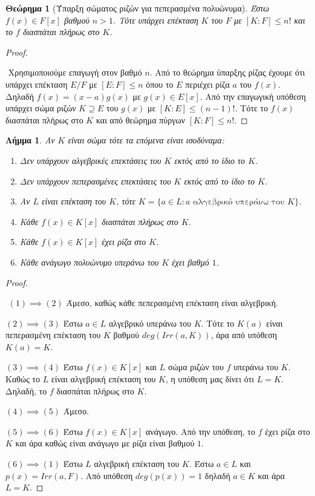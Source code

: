 \documentclass[oneside,a4paper]{article}
\newtheorem{theorem}{Θεώρημα}
\newtheorem{lemma}{Λήμμα}
\begin{document}
\begin{theorem}[Ύπαρξη σώματος ριζών για πεπερασμένα πολυώνυμα] Έστω $f(x) \in F[x]$ βαθμού $n>1$. Τότε υπάρχει επέκταση $K$ του $F$ με $[K:F]\leq n!$ και το $f$ διασπάται πλήρως στο $K$.
\end{theorem}

\begin{proof} $ $
	
	$ $\newline
	Χρησιμοποιούμε επαγωγή στον βαθμό $n$. Από το θεώρημα ύπαρξης ρίζας έχουμε ότι υπάρχει επέκταση $E/F$ με $[E:F]\leq n$ όπου το $E$ περιέχει ρίζα $a$ του $f(x)$. Δηλαδή $f(x) = (x-a) g(x)$ με $g(x) \in E[x]$. Από την επαγωγική υπόθεση υπάρχει σώμα ριζών $K\supseteq E$ του $g(x)$ με $[K:E] \leq (n-1)!$. Τότε το $f(x)$ διασπάται πλήρως στο $K$ και από θεώρημα πύργων $[K:F] \leq n!$.
\end{proof}

\begin{lemma} 
	\label{tria deka}
	Αν $K$ είναι σώμα τότε τα επόμενα είναι ισοδύναμα:
	\begin{enumerate}
		\item Δεν υπάρχουν αλγεβρικές επεκτάσεις του $K$ εκτός από το ίδιο το $K$.
		\item Δεν υπάρχουν πεπερασμένες επεκτάσεις του $K$ εκτός από το ίδιο το $K$.
		\item Αν $L$ είναι επέκταση του $K$, τότε $K = \{a \in L: a \text{ αλγεβρικό υπεράνω του } K \}$.
		\item Κάθε $f(x) \in K[x]$ διασπάται πλήρως στο $K$.
		\item Κάθε $f(x) \in K[x]$ έχει ρίζα στο $K$. 
		\item Κάθε ανάγωγο πολυώνυμο υπεράνω του $K$ έχει βαθμό $1$.
	\end{enumerate}
\end{lemma}

\begin{proof} $ $

	$ $\newline
	$(1) \implies (2)$ Άμεσο, καθώς κάθε πεπερασμένη επέκταση είναι αλγεβρική.

	\noindent $(2) \implies (3)$ Έστω $a \in L$ αλγεβρικό υπεράνω του $K$. Τότε το $K(a)$ είναι πεπερασμένη επέκταση του $K$ βαθμού $deg(Irr(a,K))$, άρα από υπόθεση $K(a) = K$.
	
	\noindent $(3) \implies (4)$ Έστω $f(x) \in K[x]$ και $L$ σώμα ριζών του $f$ υπεράνω του $K$. Καθώς το $L$ είναι αλγεβρική επέκταση του $K$, η υπόθεση μας δίνει ότι $L=K$. Δηλαδή, το $f$ διασπάται πλήρως στο $K$.
	
	\noindent $(4) \implies (5)$ Άμεσο.
	
	\noindent $(5) \implies (6)$ Έστω $f(x) \in K[x]$ ανάγωγο. Από την υπόθεση, το $f$ έχει ρίζα στο $K$ και άρα καθώς είναι ανάγωγο με ρίζα είναι βαθμού $1$.
	
	\noindent $(6) \implies (1)$ Έστω $L$ αλγεβρική επέκταση του $K$. Έστω $a \in L$ και $p(x) = Irr(a,F)$. Από υπόθεση $deg(p(x)) = 1$ δηλαδή $a \in K$ και άρα $L=K$.

\end{proof}
\end{document}
